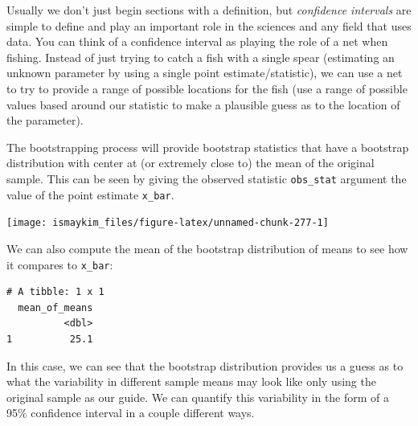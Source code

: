 \documentclass[12pt, krantz2,]{krantz}
\makeatletter
\newenvironment{Shaded}{\begin{snugshade}}{\end{snugshade}}
\newcommand{\DataTypeTok}[1]{\textcolor[rgb]{0.27,0.27,0.27}{#1}}
\newcommand{\KeywordTok}[1]{\textcolor[rgb]{0.27,0.27,0.27}{\textbf{#1}}}
\newcommand{\NormalTok}[1]{#1}
\newcommand{\OperatorTok}[1]{\textcolor[rgb]{0.43,0.43,0.43}{\textbf{#1}}}
\newcommand{\StringTok}[1]{\textcolor[rgb]{0.5,0.5,0.5}{#1}}
\newenvironment{kframe}{%
\medskip{}
\setlength{\fboxsep}{.8em}
 \def\at@end@of@kframe{}%
 \ifinner\ifhmode%
  \def\at@end@of@kframe{\end{minipage}}%
  \begin{minipage}{\columnwidth}%
 \fi\fi%
 \def\FrameCommand##1{\hskip\@totalleftmargin \hskip-\fboxsep
 \colorbox{shadecolor}{##1}\hskip-\fboxsep
     \hskip-\linewidth \hskip-\@totalleftmargin \hskip\columnwidth}%
 \MakeFramed {\advance\hsize-\width
   \@totalleftmargin\z@ \linewidth\hsize
   \@setminipage}}%
 {\par\unskip\endMakeFramed%
 \at@end@of@kframe}
\renewenvironment{Shaded}{\begin{kframe}}{\end{kframe}}
\makeatother
\begin{document}
Usually we don't just begin sections with a definition, but \emph{confidence intervals} are simple to define and play an important role in the sciences and any field that uses data. You can think of a confidence interval as playing the role of a net when fishing. Instead of just trying to catch a fish with a single spear (estimating an unknown parameter by using a single point estimate/statistic), we can use a net to try to provide a range of possible locations for the fish (use a range of possible values based around our statistic to make a plausible guess as to the location of the parameter).

The bootstrapping process will provide bootstrap statistics that have a bootstrap distribution with center at (or extremely close to) the mean of the original sample. This can be seen by giving the observed statistic \texttt{obs\_stat} argument the value of the point estimate \texttt{x\_bar}.

\begin{Shaded}
\end{Shaded}

\begin{center}\texttt{[image: ismaykim\_files/figure-latex/unnamed-chunk-277-1]} \end{center}

We can also compute the mean of the bootstrap distribution of means to see how it compares to \texttt{x\_bar}:

\begin{Shaded}
\end{Shaded}

\begin{verbatim}
# A tibble: 1 x 1
  mean_of_means
          <dbl>
1          25.1
\end{verbatim}

In this case, we can see that the bootstrap distribution provides us a guess as to what the variability in different sample means may look like only using the original sample as our guide. We can quantify this variability in the form of a 95\% confidence interval in a couple different ways.
\end{document}
